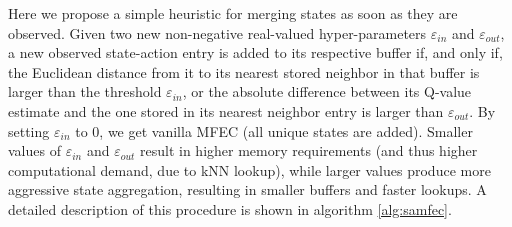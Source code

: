 \documentclass{article}
\begin{document}
Here we propose a simple heuristic for merging states as soon as they are observed. Given two new non-negative real-valued hyper-parameters $\varepsilon_{in}$ and $\varepsilon_{out}$, a new observed state-action entry is added to its respective buffer if, and only if, the Euclidean distance from it to its nearest stored neighbor in that buffer is larger than the threshold $\varepsilon_{in}$, or the absolute difference between its Q-value estimate and the one stored in its nearest neighbor entry is larger than $\varepsilon_{out}$. By setting $\varepsilon_{in}$ to $0$, we get vanilla MFEC (all unique states are added). Smaller values of $\varepsilon_{in}$ and $\varepsilon_{out}$ result in higher memory requirements (and thus higher computational demand, due to kNN lookup), while larger values produce more aggressive state aggregation, resulting in smaller buffers and faster lookups. A detailed description of this procedure is shown in algorithm \ref{alg:samfec}.
\end{document}
